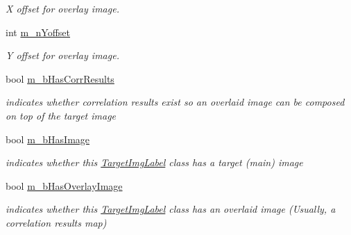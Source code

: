\begin{CompactItemize}
\begin{CompactList}\small\item\em X offset for overlay image. \item\end{CompactList}\item 
\hypertarget{classTargetImgLabel_46624a74854a56d43895ecea4b2a3da5}{
int \hyperlink{classTargetImgLabel_46624a74854a56d43895ecea4b2a3da5}{m\_\-nYoffset}}
\label{classTargetImgLabel_46624a74854a56d43895ecea4b2a3da5}

\begin{CompactList}\small\item\em Y offset for overlay image. \item\end{CompactList}\item 
\hypertarget{classTargetImgLabel_34a2b6061eb38412b7f7e88fbf741c2f}{
bool \hyperlink{classTargetImgLabel_34a2b6061eb38412b7f7e88fbf741c2f}{m\_\-bHasCorrResults}}
\label{classTargetImgLabel_34a2b6061eb38412b7f7e88fbf741c2f}

\begin{CompactList}\small\item\em indicates whether correlation results exist so an overlaid image can be composed on top of the target image \item\end{CompactList}\item 
\hypertarget{classTargetImgLabel_3b0b34d9c2f7c4f6c9aea8bc75d91d99}{
bool \hyperlink{classTargetImgLabel_3b0b34d9c2f7c4f6c9aea8bc75d91d99}{m\_\-bHasImage}}
\label{classTargetImgLabel_3b0b34d9c2f7c4f6c9aea8bc75d91d99}

\begin{CompactList}\small\item\em indicates whether this \hyperlink{classTargetImgLabel}{TargetImgLabel} class has a target (main) image \item\end{CompactList}\item 
\hypertarget{classTargetImgLabel_1c34173d16f00af22f7db9e1bb3e7b30}{
bool \hyperlink{classTargetImgLabel_1c34173d16f00af22f7db9e1bb3e7b30}{m\_\-bHasOverlayImage}}
\label{classTargetImgLabel_1c34173d16f00af22f7db9e1bb3e7b30}

\begin{CompactList}\small\item\em indicates whether this \hyperlink{classTargetImgLabel}{TargetImgLabel} class has an overlaid image (Usually, a correlation results map) \item\end{CompactList}\end{CompactItemize}


